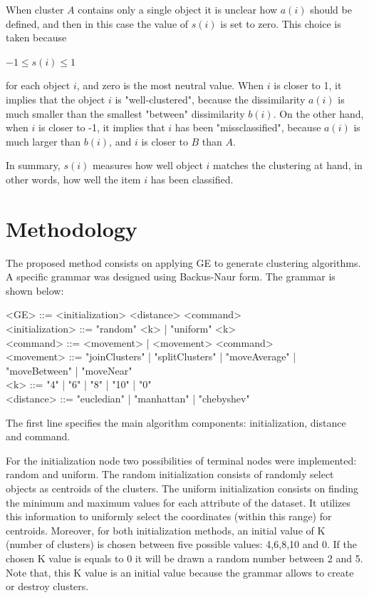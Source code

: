 \documentclass[journal]{IEEEtran}
\begin{document}
	When cluster $A$ contains only a single object it is unclear how $a(i)$ should be defined, and then in this case the value of $s(i)$ is set to zero. This choice is taken because
	\begin{center}
		$-1 \le s(i) \le 1$
	\end{center}
	
	for each object $i$, and zero is the most neutral value. When $i$ is closer to 1, it implies that the object $i$ is "well-clustered", because the dissimilarity $a(i)$ is much smaller than the smallest "between" dissimilarity $b(i)$. On the other hand, when $i$ is closer to -1, it implies that $i$ has been "missclassified", because $a(i)$ is much larger than $b(i)$, and $i$ is closer to $B$ than $A$.
	
	In summary, $s(i)$ measures how well object $i$ matches the clustering at hand, in other words, how well the item $i$ has been classified.
	
	
	\section{Methodology} \label{sec:methodology}
	
	The proposed method consists on applying GE to generate clustering algorithms. A specific grammar was designed  using  Backus-Naur form. The grammar is shown below:
	
	
	\begin{grammar}
		<GE> ::= <initialization> <distance> <command> 
		\\ <initialization> ::= "random" <k> | "uniform" <k>
		\\ <command> ::= <movement> | <movement> <command>
		\\ <movement> ::= "joinClusters" | "splitClusters" | "moveAverage" | "moveBetween" | "moveNear" 
		\\ <k> ::= "4" | "6" | "8" | "10" | "0"
		\\ <distance> ::= "eucledian" | "manhattan" | "chebyshev"
		\label{ge-clustering-grammar}
	\end{grammar}
	
	
	The first line specifies the main algorithm components: initialization, distance and command. 
	
	For the initialization node two possibilities of terminal nodes were implemented: random and uniform. The random initialization consists of randomly select objects as centroids of the clusters. The uniform initialization consists on finding the minimum and maximum values for each attribute of the dataset. It utilizes this information to uniformly select the coordinates (within this range) for centroids. Moreover, for both initialization methods, an initial value of K (number of clusters) is chosen between five possible values: 4,6,8,10 and 0. If the chosen K value is equals to 0 it will be drawn a random number between 2 and 5. Note that, this K value is an initial value because the grammar allows to create or destroy clusters. 
	
\end{document}
